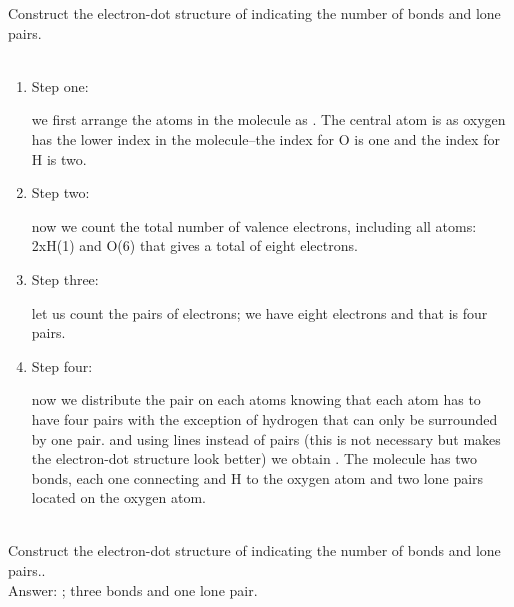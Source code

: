 \documentclass[main.tex]{subfiles}
\begin{document}
\begin{description}
\begin{example} %
Construct the electron-dot structure of  indicating the number of bonds and lone pairs.\\
\\
\begin{enumerate}[label=\protect\circled{\color{white}\arabic*}]
\item \begin{bf}Step one:\end{bf} we first arrange the atoms in the molecule as \hspace{.05in}\hspace{.05in}. The central atom is  as oxygen has the lower index in the  molecule--the index for O is one and the index for H is two.
\item \begin{bf}Step two:\end{bf} now we count the total number of valence electrons, including all atoms: 2xH(1) and O(6) that gives a total of eight electrons.
 \item \begin{bf}Step three:\end{bf} let us count the pairs of electrons; we have eight electrons and that is four pairs.
\item \begin{bf}Step four:\end{bf} now we distribute the pair on each atoms knowing that each atom has to have four pairs with the exception of hydrogen that can only be surrounded by one pair.
\hspace{.05in}\hspace{.05in}\hspace{.05in} and using lines instead of pairs (this is not necessary but makes the electron-dot structure look better) we obtain \hspace{.05in}. The molecule has two bonds, each one connecting and H to the oxygen atom and two lone pairs located on the oxygen atom.
\end{enumerate}
\faDiamond\ \\
Construct the electron-dot structure of  indicating the number of bonds and lone pairs..\\
\flushright Answer: ; three bonds and one lone pair.
\end{example}%


\end{description}
\end{document}
